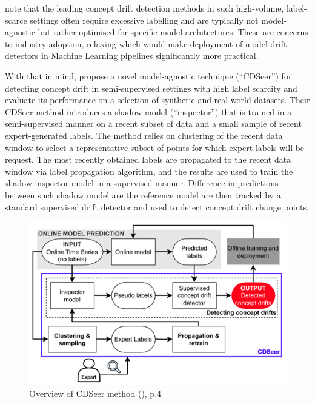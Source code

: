\documentclass{svproc}
\begin{document}
    \cite{pham2025} note that the leading concept drift detection methods in such high-volume, label-scarce settings often require excessive labelling and are typically not model-agnostic but rather optimised for specific model architectures. These are concerns to industry adoption, relaxing which would make deployment of model drift detectors in Machine Learning pipelines significantly more practical. 
    
    With that in mind, \cite{pham2025} propose a novel model-agnostic technique (“CDSeer”) for detecting concept drift in semi-supervised settings with high label scarcity and evaluate its performance on a selection of synthetic and real-world datasets. Their CDSeer method introduces a shadow model (“inspector”) that is trained in a semi-supervised manner on a recent subset of data and a small sample of recent expert-generated labels. The method relies on clustering of the recent data window to select a representative subset of points for which expert labels will be request. The most recently obtained labels are propagated to the recent data window via label propagation algorithm, and the results are used to train the shadow inspector model in a supervised manner. Difference in predictions between such shadow model are the reference model are then tracked by a standard supervised drift detector and used to detect concept drift change points.
    
     \begin{figure}
    	\centering
    	\includegraphics[scale=.40]{figures/Fig1_CDseer.png}
    	\caption{Overview of CDSeer method (\cite{pham2025}), p.4}
    	\label{fig:fig1}
    \end{figure}
    
\end{document}

